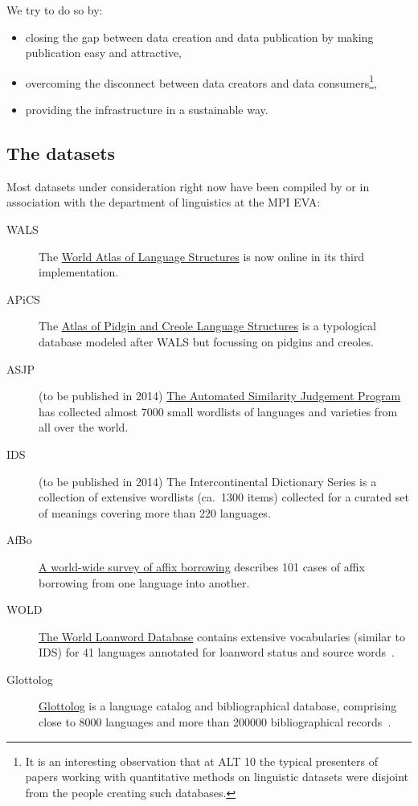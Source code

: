 \documentclass[a4paper,10pt]{article}
\begin{document}
We try to do so by:
\begin{itemize}
\item closing the gap between data creation and data publication by making publication easy and attractive,
\item overcoming the disconnect between data creators and data consumers\footnote{It is an
interesting observation that at ALT 10 the typical presenters of papers working with
quantitative methods on linguistic datasets were disjoint from the people creating such databases.},
\item providing the infrastructure in a sustainable way.
\end{itemize}

\subsection{The datasets}
Most datasets under consideration right now
have been compiled by or in association with the department of linguistics at the MPI EVA:
\begin{description}
\item[WALS] The \href{http://wals.info}{World Atlas of Language Structures} is now online in its third implementation.
\item[APiCS] The \href{http://apics-online.info}{Atlas of Pidgin and Creole Language Structures} is a typological database modeled after WALS but focussing on pidgins and creoles.
\item[ASJP] (to be published in 2014) \href{http://wwwstaff.eva.mpg.de/~wichmann/ASJPHomePage.htm}{The Automated Similarity Judgement Program} has collected almost 7000 small wordlists of languages and varieties from all over the world.
\item[IDS] (to be published in 2014) The Intercontinental Dictionary Series is a collection of extensive wordlists (ca.~1300 items)
collected for a curated set of meanings covering more than 220 languages.
\item[AfBo] \href{http://afbo.info/}{A world-wide survey of affix borrowing} describes 101 cases of affix borrowing from one language into another.
\item[WOLD] \href{http://wold.livingsources.org}{The World Loanword Database} contains extensive vocabularies (similar to IDS) for 41 languages annotated for loanword status and source words~\cite{tadmor2009}.
\item[Glottolog] \href{http://glottolog.org}{Glottolog} is a language catalog and bibliographical database, comprising close to 8000 languages and more than 200000 bibliographical records~\cite{nordhoff2012}.
\end{description}
\end{document}
